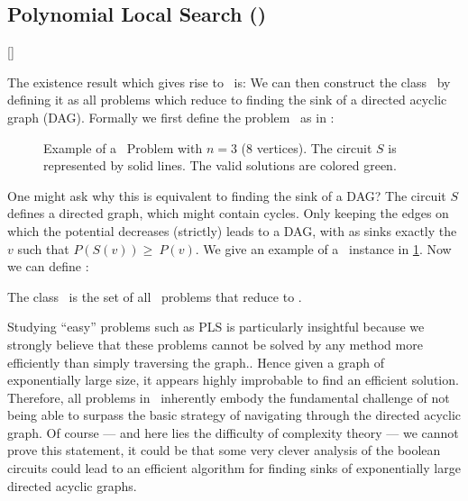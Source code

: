 \subsection{Polynomial Local Search (\PLS)}[\PLS]

The existence result which gives rise to \PLS\ is:
We can then construct the class \PLS\ by defining it as all problems which reduce to finding the sink of a directed acyclic graph (DAG). Formally we first define the problem \Localopt\ as in :


\begin{figure}
    \centering
    \caption[Example of a \Localopt\ Problem]{Example of a \Localopt\ Problem with $n=3$ (8 vertices). The circuit $S$ is represented by solid lines. The valid solutions are colored green.}
    \label{fig:localopt_example}
\end{figure}

One might ask why this is equivalent to finding the sink of a DAG\@? The circuit $S$ defines a directed graph, which might contain cycles. Only keeping the edges on which the potential decreases (strictly) leads to a DAG, with as sinks exactly the $v$ such that $P(S(v)) \geq\ P(v)$. We give an example of a \Localopt\ instance in \cref{fig:localopt_example}. Now we can define \PLS:

\begin{definition}
    The class \PLS\ is the set of all \TFNP\ problems that reduce to \Localopt.
\end{definition}

Studying ``easy'' problems such as PLS is particularly insightful because we strongly believe that these problems cannot be solved by any method more efficiently than simply traversing the graph.. Hence given a graph of exponentially large size, it appears highly improbable to find an efficient solution. Therefore, all problems in \PLS\ inherently embody the fundamental challenge of not being able to surpass the basic strategy of navigating through the directed acyclic graph. Of course --- and here lies the difficulty of complexity theory --- we cannot prove this statement, it could be that some very clever analysis of the boolean circuits could lead to an efficient algorithm for finding sinks of exponentially large directed acyclic graphs.

